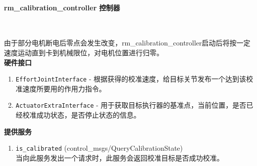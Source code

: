 \paragraph{rm\_calibration\_controller 控制器}~{}
\par
由于部分电机断电后零点会发生改变，rm\_calibration\_controller启动后将按一定速度运动直到卡到机械限位，对电机位置进行归零。\\
\textbf{硬件接口}
\begin{enumerate}
    \item \lstinline{EffortJointInterface} -  根据获得的校准速度，给目标关节发布一个达到该校准速度所要用的作用力指令。
    \item \lstinline{ActuatorExtraInterface} - 用于获取目标执行器的基准点，当前位置，是否已经校准成功状态，是否停止状态的信息。
\end{enumerate}
\textbf{提供服务}
\begin{enumerate}
    \item \lstinline{is_calibrated} (control\_msgs/QueryCalibrationState)\\
    当向此服务发出一个请求时，此服务会返回校准目标是否成功校准。
\end{enumerate}


